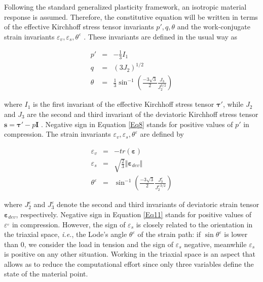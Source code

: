 \documentclass[preprint,12pt,a4paper]{elsarticle}
\begin{document}
Following the standard generalized plasticity framework, an isotropic material response is assumed. Therefore, the constitutive equation will be written in terms of the effective Kirchhoff stress tensor invariants  $p', q, \theta $ and the work-conjugate strain invariants $\varepsilon_v, \varepsilon_s, \theta^{\varepsilon}$ . These invariants are defined in the usual way as

\begin{eqnarray}
p' &=&-\frac{1}{3}I_1 \label{Eq8}\\ 
q &=&(3J_2)^{1/2}\label{Eq9} \\
\theta &=& \frac{1}{3} \sin^{-1}\left(\frac{-3\sqrt{3}}{2}\frac{J_3}{J_2^{3/2}}\right)\label{Eq10} 
\end{eqnarray}

where $I_1$ is the first invariant of the effective Kirchhoff stress tensor $\boldsymbol{\tau}'$,  while $J_2$ and $J_3$ are the second and third invariant of the deviatoric Kirchhoff stress tensor $\boldsymbol{s}=\boldsymbol{\tau}'-p\boldsymbol{I}$ . Negative sign in Equation \eqref{Eq8} stands for positive values of $p'$ in compression. The strain invariants $\varepsilon_v, \varepsilon_s, \theta^{\varepsilon}$ are defined by


\begin{eqnarray}
\varepsilon_v &=&- tr(\boldsymbol{\varepsilon})\label{Eq11}\\ 
\varepsilon_s &=&\sqrt{\frac{2}{3}}\Vert \boldsymbol{\varepsilon}_{dev} \Vert \label{Eq12}\\ 
\theta^{\varepsilon} &=& \sin^{-1}\left(\frac{-3\sqrt{3}}{2}\frac{J^{\varepsilon}_3}{J_2^{\varepsilon \, 3/2}}\right)\label{Eq13} 
\end{eqnarray}



where $J^{\varepsilon}_2$ and $J^{\varepsilon}_3$ denote the second
and third invariants of deviatoric strain tensor $\boldsymbol{\varepsilon}_{dev}$, respectively. Negative sign in Equation \eqref{Eq11} stands for positive values of $\varepsilon^_v$ in compression. However, the sign of $\varepsilon_s$ is closely related to the orientation in the triaxial space, \textit{i.e.}, the Lode's angle $\theta^{\varepsilon}$ of the strain path: if $\sin \theta^{\varepsilon}$ is lower than 0, we consider the load in tension and the sign of $\varepsilon_s$ negative, meanwhile $\varepsilon_s$ is positive on any other situation. Working in the triaxial space is an aspect that allows as to reduce the computational effort since only three variables define the state of the material point.
\end{document}
